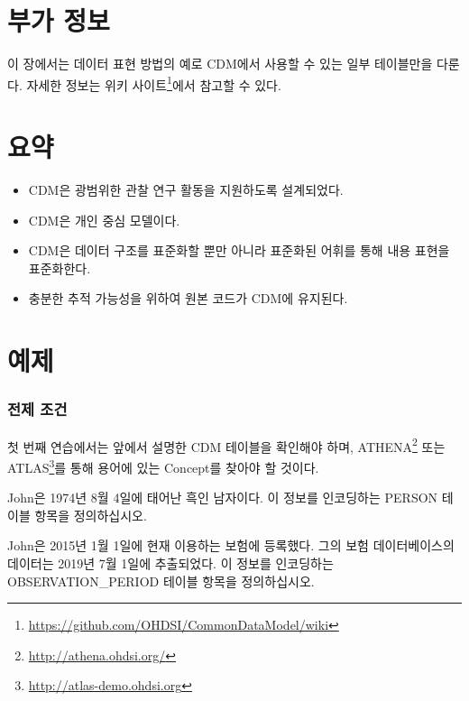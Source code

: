 \documentclass[11pt]{book}
\let\rmarkdownfootnote\footnote%
\def\footnote{\protect\rmarkdownfootnote}
\theoremstyle{definition}
\theoremstyle{definition}
\theoremstyle{definition}
\theoremstyle{remark}
\let\BeginKnitrBlock\begin \let\EndKnitrBlock\end
\begin{document}
\section{부가 정보}\label{-}

이 장에서는 데이터 표현 방법의 예로 CDM에서 사용할 수 있는 일부
테이블만을 다룬다. 자세한 정보는 위키 사이트\footnote{\url{https://github.com/OHDSI/CommonDataModel/wiki}}에서
참고할 수 있다.

\section{요약}\label{-2}

\BeginKnitrBlock{rmdsummary}
\begin{itemize}
\item
  CDM은 광범위한 관찰 연구 활동을 지원하도록 설계되었다.
\item
  CDM은 개인 중심 모델이다.
\item
  CDM은 데이터 구조를 표준화할 뿐만 아니라 표준화된 어휘를 통해 내용
  표현을 표준화한다.
\item
  충분한 추적 가능성을 위하여 원본 코드가 CDM에 유지된다.
\end{itemize}
\EndKnitrBlock{rmdsummary}

\section{예제}

\subsubsection*{전제 조건}\label{-}

첫 번째 연습에서는 앞에서 설명한 CDM 테이블을 확인해야 하며,
ATHENA\footnote{\url{http://athena.ohdsi.org/}} 또는 ATLAS\footnote{\url{http://atlas-demo.ohdsi.org}}를
통해 용어에 있는 Concept를 찾아야 할 것이다.

\BeginKnitrBlock{exercise}
\protect\hypertarget{exr:exerciseJohnPerson}{}{\label{exr:exerciseJohnPerson}
}John은 1974년 8월 4일에 태어난 흑인 남자이다. 이 정보를 인코딩하는
PERSON 테이블 항목을 정의하십시오.
\EndKnitrBlock{exercise}

\BeginKnitrBlock{exercise}
\protect\hypertarget{exr:exerciseJohnOp}{}{\label{exr:exerciseJohnOp}
}John은 2015년 1월 1일에 현재 이용하는 보험에 등록했다. 그의 보험
데이터베이스의 데이터는 2019년 7월 1일에 추출되었다. 이 정보를
인코딩하는 OBSERVATION\_PERIOD 테이블 항목을 정의하십시오.
\EndKnitrBlock{exercise}
\end{document}
